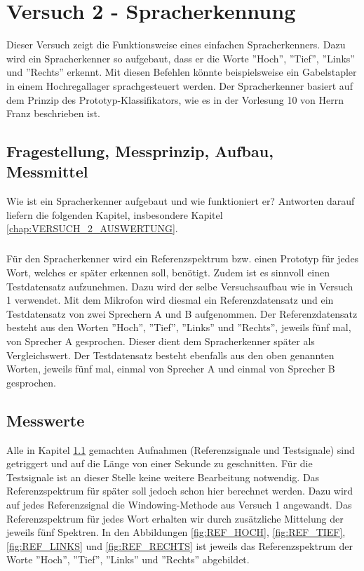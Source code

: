 \documentclass[12pt,oneside,a4paper]{report}
\begin{document}
%
%
\chapter{Versuch 2 - Spracherkennung}
\label{chap:VERSUCH_2}

Dieser Versuch zeigt die Funktionsweise eines einfachen Spracherkenners.
Dazu wird ein Spracherkenner so aufgebaut, dass er die Worte ''Hoch'', ''Tief'', ''Links'' und ''Rechts'' erkennt. Mit diesen Befehlen könnte beispielsweise ein Gabelstapler in einem Hochregallager sprachgesteuert werden. Der Spracherkenner basiert auf dem Prinzip des Prototyp-Klassifikators, wie es in der Vorlesung 10 von Herrn Franz \cite{Franz2015i} beschrieben ist.

\section{Fragestellung, Messprinzip, Aufbau, Messmittel}
\label{chap:VERSUCH_2_FRAGESTELLUNG}

Wie ist ein Spracherkenner aufgebaut und wie funktioniert er?
Antworten darauf liefern die folgenden Kapitel, insbesondere Kapitel \ref{chap:VERSUCH_2_AUSWERTUNG}.

\paragraph{}

Für den Spracherkenner wird ein Referenzspektrum bzw. einen Prototyp für jedes Wort, welches er später erkennen soll, benötigt. Zudem ist es sinnvoll einen Testdatensatz aufzunehmen.
Dazu wird der selbe Versuchsaufbau wie in Versuch 1 verwendet.
Mit dem Mikrofon wird diesmal ein Referenzdatensatz und ein Testdatensatz von zwei Sprechern A und B aufgenommen.
Der Referenzdatensatz besteht aus den Worten ''Hoch'', ''Tief'', ''Links'' und ''Rechts'', jeweils fünf mal, von Sprecher A gesprochen. Dieser dient dem Spracherkenner später als Vergleichswert. Der Testdatensatz besteht ebenfalls aus den oben genannten Worten, jeweils fünf mal, einmal von Sprecher A und einmal von Sprecher B gesprochen.

\section{Messwerte}
\label{chap:VERSUCH_2_MESSWERTE}

Alle in Kapitel \ref{chap:VERSUCH_2_FRAGESTELLUNG} gemachten Aufnahmen (Referenzsignale und Testsignale) sind getriggert und auf die Länge von einer Sekunde zu geschnitten.
Für die Testsignale ist an dieser Stelle keine weitere Bearbeitung notwendig.
Das Referenzspektrum für später soll jedoch schon hier berechnet werden.
Dazu wird auf jedes Referenzsignal die Windowing-Methode aus Versuch 1 angewandt.
Das Referenzspektrum für jedes Wort erhalten wir durch zusätzliche Mittelung der jeweils fünf Spektren.
In den Abbildungen \ref{fig:REF_HOCH}, \ref{fig:REF_TIEF}, \ref{fig:REF_LINKS} und  \ref{fig:REF_RECHTS} ist jeweils das Referenzspektrum der Worte ''Hoch'', ''Tief'', ''Links'' und ''Rechts'' abgebildet.
\end{document}
